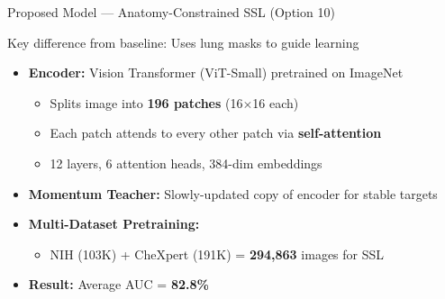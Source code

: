 \documentclass{beamer}
\begin{document}
\begin{frame}{Proposed Model --- Anatomy-Constrained SSL (Option 10)}
\begin{block}{Key difference from baseline: Uses lung masks to guide learning}
\end{block}
\vspace{4pt}
\begin{itemize}
    \item \textbf{Encoder:} Vision Transformer (ViT-Small) pretrained on ImageNet
    \begin{itemize}
        \item Splits image into \textbf{196 patches} (16$\times$16 each)
        \item Each patch attends to every other patch via \textbf{self-attention}
        \item 12 layers, 6 attention heads, 384-dim embeddings
    \end{itemize}
    \vspace{4pt}
    \item \textbf{Momentum Teacher:} Slowly-updated copy of encoder for stable targets
    \vspace{4pt}
    \item \textbf{Multi-Dataset Pretraining:}
    \begin{itemize}
        \item NIH (103K) + CheXpert (191K) = \textbf{294,863} images for SSL
    \end{itemize}
    \vspace{4pt}
    \item \textbf{Result:} Average AUC = \textbf{82.8\%}
\end{itemize}
\end{frame}
\end{document}

